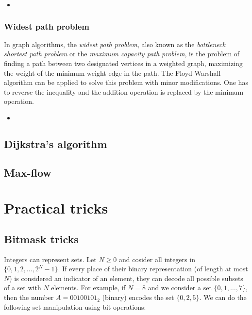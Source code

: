 \documentclass[a4paper, twoside,openany]{book}
\newcounter{problem}\setcounter{problem}{0}
\newcommand{\insertcode}[2]{\begin{itemize}\item[]\end{itemize}} %
\begin{document}
\insertcode{"codes/floyd_warshall_reconstruct.cpp"}{A C++ code for the Floyd-Warshall algorithm with information about the minimal path.} 

\subsection{Widest path problem}
In graph algorithms, the \emph{widest path problem}, also known as the \emph{bottleneck shortest path problem} or the \emph{maximum capacity path problem}, is the problem of finding a path between two designated vertices in a weighted graph, maximizing the weight of the minimum-weight edge in the path.
The Floyd-Warshall algorithm can be applied to solve this problem with minor modifications.
One has to reverse the inequality and the addition operation is replaced by the minimum operation.

\insertcode{"codes/floyd_warshall_routing.cpp"}{A C++ code for the Floyd-Warshall algorithm used for optimal routing in a constrained network.} 


\section{Dijkstra's algorithm}
\label{Dijkstra}


\section{Max-flow}
\label{max-flow}

\chapter{Practical tricks}

\section{Bitmask tricks}
\label{bitmask}

Integers can represent sets. Let $N \geq 0$ and cosider all integers in $\{ 0, 1, 2, \ldots, 2^N-1 \}$. If every place of their binary representation (of length at most $N$) is considered an indicator of an element, they can decode all possible subsets of a set with $N$ elements. For example, if $N=8$ and we consider a set $\{ 0, 1, \ldots, 7\}$, then the number $A=00100101_2$ (binary) encodes the set $\{ 0, 2, 5 \}$. We can do the following set manipulation using bit operations:
\end{document}
